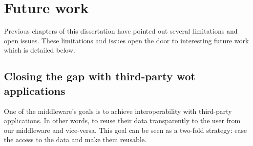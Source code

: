 \section{Future work}


Previous chapters of this dissertation have pointed out several limitations and open issues.
These limitations and issues open the door to interesting future work which is detailed below.


\subsection{Closing the gap with third-party \acs{wot} applications}

One of the middleware's goals is to achieve interoperability with third-party applications.
In other words, to reuse their data transparently to the user from our middleware and vice-versa.
This goal can be seen as a two-fold strategy: ease the access to the data and make them reusable.

